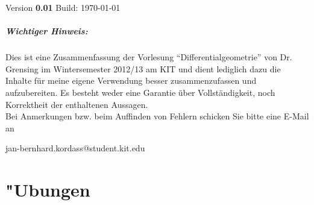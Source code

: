 \documentclass[paper=A4, twoside, chapterprefix=true, bibliography=totoc, headsepline]{scrbook}
\renewcommand{\thesection}{\arabic{section}}
\renewcommand*{\sectionmarkformat}{\thesection\autodot\enskip}
\begin{document}

\vspace{0.5cm}

Version \textbf{0.01} \quad Build: \today

\paragraph{Wichtiger Hinweis:}
Dies ist eine Zusammenfassung der Vorlesung "`Differentialgeometrie"' von Dr. Grensing im Wintersemester 2012/13 am KIT und dient lediglich dazu die Inhalte für meine eigene Verwendung besser zusammenzufassen und aufzubereiten. Es besteht weder eine Garantie über Vollständigkeit, noch Korrektheit der enthaltenen Aussagen.\\

Bei Anmerkungen bzw. beim Auffinden von Fehlern schicken Sie bitte eine E-Mail an
\begin{center}
  jan-bernhard.kordass@student.kit.edu
\end{center}









\appendix


\chapter{"Ubungen}

\renewcommand*{\othersectionlevelsformat}[3]{\ifstr{#1}{section}{\"Ubung\ #3\ vom\ }{#3\autodot\enskip}}


\setcounter{section}{-1}






\printindex


\printglossaries

\end{document}
